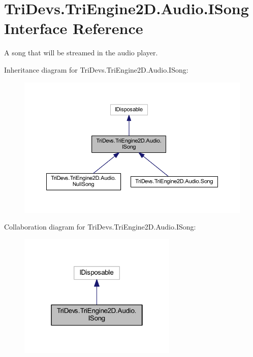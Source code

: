 \hypertarget{interface_tri_devs_1_1_tri_engine2_d_1_1_audio_1_1_i_song}{\section{Tri\-Devs.\-Tri\-Engine2\-D.\-Audio.\-I\-Song Interface Reference}
\label{interface_tri_devs_1_1_tri_engine2_d_1_1_audio_1_1_i_song}
}


A song that will be streamed in the audio player.  




Inheritance diagram for Tri\-Devs.\-Tri\-Engine2\-D.\-Audio.\-I\-Song\-:
\nopagebreak
\begin{figure}[H]
\begin{center}
\leavevmode
\includegraphics[width=350pt]{interface_tri_devs_1_1_tri_engine2_d_1_1_audio_1_1_i_song__inherit__graph}
\end{center}
\end{figure}


Collaboration diagram for Tri\-Devs.\-Tri\-Engine2\-D.\-Audio.\-I\-Song\-:
\nopagebreak
\begin{figure}[H]
\begin{center}
\leavevmode
\includegraphics[width=214pt]{interface_tri_devs_1_1_tri_engine2_d_1_1_audio_1_1_i_song__coll__graph}
\end{center}
\end{figure}
